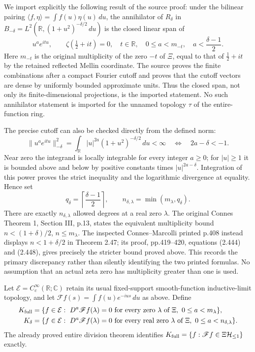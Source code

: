 We import explicitly the following result of the source proof:
under the bilinear pairing $\langle f,\eta\rangle=\int f(u)\eta(u)\,du$,
the annihilator of $R_\delta$ in
$B_{-\delta}=L^2(\mathbb R,(1+u^2)^{-\delta/2}\,du)$ is the closed
linear span of
\begin{equation}\label{csq:eq-sobolev-source-annihilator}
 u^a e^{itu},\qquad
 \zeta(\tfrac12+it)=0,\quad t\in\mathbb R,\quad
 0\leq a<m_{-t},\quad a<\frac{\delta-1}{2}.
\end{equation}
Here $m_{-t}$ is the original multiplicity of the zero $-t$ of
$\Xi$, equal to that of $\tfrac12+it$ by the retained reflected
Mellin coordinate. The source proves the finite combinations after a
compact Fourier cutoff and proves that the cutoff vectors are dense
by uniformly bounded approximate units. Thus the closed span, not
only its finite-dimensional projections, is the imported statement.
No such annihilator statement is imported for the unnamed topology
$\tau$ of the entire-function ring.

The precise cutoff can also be checked directly from the defined norm:
\[
 \|u^a e^{itu}\|_{-\delta}^2
   =\int_{\mathbb R}|u|^{2a}(1+u^2)^{-\delta/2}\,du<\infty
 \quad\Longleftrightarrow\quad 2a-\delta<-1.
\]
Near zero the integrand is locally integrable for every integer $a\geq0$;
for $|u|\geq1$ it is bounded above and below by positive constants
times $|u|^{2a-\delta}$. Integration of this power proves the strict
inequality and the logarithmic divergence at equality. Hence set
\begin{equation}\label{csq:eq-sobolev-jetcount}
 q_\delta=\left\lceil\frac{\delta-1}{2}\right\rceil,
 \qquad n_{\delta,\lambda}=\min(m_\lambda,q_\delta).
\end{equation}
There are exactly $n_{\delta,\lambda}$ allowed degrees at a real zero
$\lambda$. The original Connes Theorem 1, Section III, p.13, states
the equivalent multiplicity bound $n<(1+\delta)/2$, $n\leq m_\lambda$.
The inspected Connes--Marcolli printed p.408 instead displays
$n<1+\delta/2$ in Theorem 2.47; its proof, pp.419--420,
equations (2.444) and (2.448), gives precisely the stricter bound
proved above. This records the primary discrepancy rather than
silently identifying the two printed formulas. No assumption that
an actual zeta zero has multiplicity greater than one is used.

Let $\mathcal E=C_c^\infty(\mathbb R;\mathbb C)$ retain its usual
fixed-support smooth-function inductive-limit topology, and let
$\mathscr Ff(s)=\int f(u)e^{-ius}\,du$ as above. Define
\begin{align}
 K_{\rm full}
   &=\{f\in\mathcal E:\ D^a\mathscr Ff(\lambda)=0
               \text{ for every zero }\lambda\text{ of }\Xi,
                         \ 0\leq a<m_\lambda\},
       \label{csq:eq-sobolev-full-kernel}\\
 K_\delta
   &=\{f\in\mathcal E:\ D^a\mathscr Ff(\lambda)=0
               \text{ for every real zero }\lambda\text{ of }\Xi,
                         \ 0\leq a<n_{\delta,\lambda}\}.
       \label{csq:eq-sobolev-kernel}
\end{align}
The already proved entire division theorem identifies
$K_{\rm full}=\{f:\mathscr Ff\in\Xi\mathcal H_{\leq 1}\}$ exactly.

